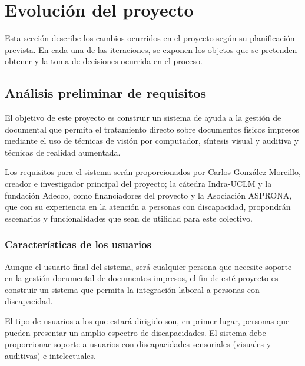 \section{Evolución del proyecto}
Esta sección describe los cambios ocurridos en el proyecto según su planificación prevista. En cada una de las iteraciones, se exponen los objetos que se pretenden obtener y la toma de decisiones ocurrida en el proceso.


\subsection{Análisis preliminar de requisitos}
El objetivo de este proyecto es construir un sistema de ayuda a la gestión de documental que permita el tratamiento directo sobre documentos físicos impresos mediante el uso de técnicas de visión por computador, síntesis visual y auditiva y técnicas de realidad aumentada.

Los requisitos para el sistema serán proporcionados por Carlos González Morcillo, creador e investigador principal del proyecto; la cátedra Indra-UCLM y la fundación Adecco, como financiadores del proyecto y la Asociación ASPRONA, que con su experiencia en la atención a personas con discapacidad, propondrán escenarios y funcionalidades que sean de utilidad para este colectivo. 

\subsubsection{Características de los usuarios}
Aunque el usuario final del sistema, será cualquier persona que necesite soporte en la gestión documental de documentos impresos, el fin de esté proyecto es construir un sistema que permita la integración laboral a personas con discapacidad. 

El tipo de usuarios a los que estará dirigido son, en primer lugar, personas que pueden presentar un amplio espectro de discapacidades. El sistema debe proporcionar soporte a usuarios con discapacidades sensoriales (visuales y auditivas) e intelectuales.  

